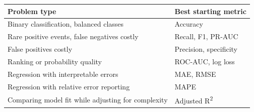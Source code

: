 \documentclass[11pt,a4paper]{article}
\begin{document}
\begin{tabularx}{\textwidth}{@{}lX@{}}
\toprule
\rowcolor{tablehead} \textbf{Problem type} & \textbf{Best starting metric} \\
\midrule
Binary classification, balanced classes & Accuracy \\
Rare positive events, false negatives costly & Recall, F1, PR-AUC \\
False positives costly & Precision, specificity \\
Ranking or probability quality & ROC-AUC, log loss \\
Regression with interpretable errors & MAE, RMSE \\
Regression with relative error reporting & MAPE \\
Comparing model fit while adjusting for complexity & Adjusted R\textsuperscript{2} \\
\bottomrule
\end{tabularx}

\end{document}
